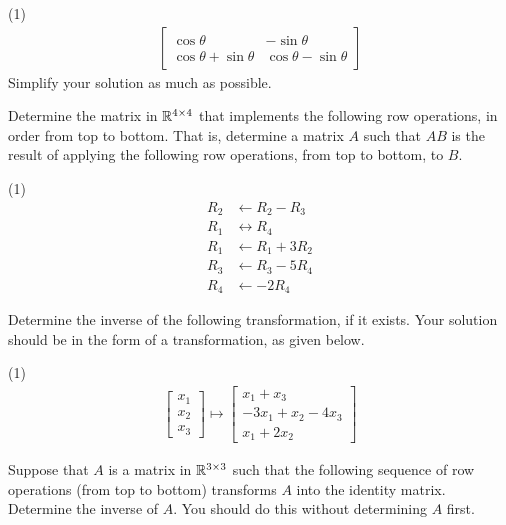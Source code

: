 \begin{tasks}[resume, style=enumerate](1)
\task
  \begin{align*}
    \begin{bmatrix}
      \cos \theta & -\sin \theta \\
      \cos \theta + \sin \theta & \cos \theta - \sin \theta
    \end{bmatrix}
  \end{align*}
  Simplify your solution as much as possible.
\end{tasks}
Determine the matrix in $\mathbb R^{4 \times 4}$ that implements the
following row operations, in order from top to bottom.  That is,
determine a matrix $A$ such that $AB$ is the result of applying the
following row operations, from top to bottom, to $B$.
\begin{tasks}[resume, style=enumerate](1)
\task
  \begin{align*}
    R_{2} &\gets R_{2} - R_{3} \\
    R_{1} &\leftrightarrow R_{4} \\
    R_{1} &\gets R_{1} + 3R_{2} \\
    R_{3} &\gets R_{3} - 5R_{4} \\
    R_{4} &\gets -2R_{4}
  \end{align*}
\end{tasks}
Determine the inverse of the following transformation, if it exists.
Your solution should be in the form of a transformation, as given
below.
\begin{tasks}[resume, style=enumerate](1)
\task
  \begin{align*}
    \begin{bmatrix}
      x_{1} \\
      x_{2} \\
      x_{3}
    \end{bmatrix} \mapsto \begin{bmatrix}
      x_{1} + x_{3} \\
      -3x_{1} + x_{2} - 4x_{3} \\
      x_{1} + 2x_{2}
    \end{bmatrix}
  \end{align*}
\end{tasks}
Suppose that $A$ is a matrix in $\mathbb R^{3 \times 3}$ such that the
following sequence of row operations (from top to bottom) transforms
$A$ into the identity matrix.  Determine the inverse of $A$.  You
should do this without determining $A$ first.

